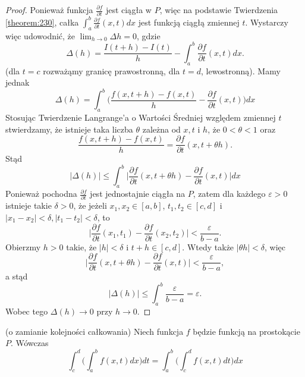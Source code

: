 \documentclass[leqno]{article}
\begin{document}
\begin{justify}
\begin{proof}
    Ponieważ funkcja $\frac{\partial f}{\partial t}$ jest ciągła w $P$, więc na podstawie Twierdzenia \ref{theorem:230}, całka
    $\int_{a}^{b}\frac{\partial f}{\partial t}(x,t)dx$ jest funkcją ciągłą zmiennej $t$. Wystarczy więc udowodnić, że $\lim_{h \to 0}\Delta h = 0$,
    gdzie 
    \[
        \Delta(h) = \frac{I(t+h) - I(t)}{h} - \int_{a}^{b}\frac{\partial f}{\partial t}(x,t)dx.
    \]
    (dla $t = c$ rozważąmy granicę prawostronną, dla $t = d$, lewostronną). Mamy jednak
    \[
        \Delta(h) = \int_{a}^{b}\Big(\frac{f(x, t+h) - f(x,t)}{h} - \frac{\partial f}{\partial t}(x,t)\Big)dx
    \]
    Stosując Twierdzenie Langrange'a o Wartości Średniej względem zmiennej $t$ stwierdzamy, że istnieje taka liczba $\theta$ zależna od $x,t$ i $h$, że 
    $0 < \theta < 1$ oraz 
    \[
        \frac{f(x, t+h) - f(x,t)}{h} = \frac{\partial f}{\partial t}(x,t + \theta h). 
    \]
    Stąd 
    \[
        |\Delta(h)| \leqslant \int_{a}^{b}\Big|\frac{\partial f}{\partial t}(x, t + \theta h) - \frac{\partial f}{\partial t}(x,t)\Big|dx
    \]
    Ponieważ pochodna $\frac{\partial f}{\partial t}$ jest jednostajnie ciągła na $P$, zatem dla każdego $\varepsilon > 0$
    istnieje takie $\delta > 0$, że jeżeli $x_1, x_2 \in [a,b]$, $t_1, t_2 \in [c,d]$ i $|x_1 - x_2| < \delta, |t_1 - t_2| < \delta$, to 
    \[
        \Big| \frac{\partial f}{\partial t}(x_1, t_1) - \frac{\partial f}{\partial t}(x_2, t_2)\Big| < \frac{\varepsilon}{b-a}.
    \]
    Obierzmy $h > 0$ takie, że $|h| < \delta$ i $t + h \in [c,d]$. Wtedy także $|\theta h| < \delta$, więc 
    \[
        \Big|\frac{\partial f}{\partial t}(x, t + \theta h) - \frac{\partial f}{\partial t}(x,t)\Big| < \frac{\varepsilon}{b-a},
    \]
    a stąd 
    \[
        |\Delta(h)| \leqslant \int_{a}^{b}\frac{\varepsilon}{b-a} = \varepsilon.
    \]
    Wobec tego $\Delta(h) \to 0$ przy $h \to 0$.
\end{proof}

\setcounter{equation}{178}

\begin{theorem}
{
    (o zamianie kolejności całkowania) Niech funkcja $f$ będzie funkcją na prostokącie $P$. Wówczas 
    \begin{equation}\label{eq:179}
        \int_{c}^{d}\Big( \int_{a}^{b}f(x,t)dx\Big)dt = \int_{a}^{b}\Big(\int_{c}^{d}f(x,t)dt \Big)dx
    \end{equation}
}
\end{theorem}


\end{justify}
\end{document}
